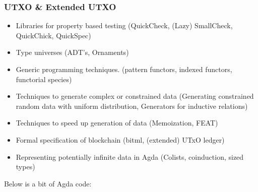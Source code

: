 \documentclass[11pt]{article}
\begin{document}
\subsubsection{UTXO \& Extended UTXO}

\begin{itemize}

\item
Libraries for property based testing (QuickCheck, (Lazy) SmallCheck, QuickChick, QuickSpec)

\item 
Type universes (ADT's, Ornaments) \cite{ko2016programming, dagand2017essence}

\item 
Generic programming techniques. (pattern functors, indexed functors, functorial species)

\item 
Techniques to generate complex or constrained data (Generating constrained random data with uniform distribution, Generators for inductive relations)

\item 
Techniques to speed up generation of data (Memoization, FEAT)

\item 
Formal specification of blockchain (bitml, (extended) UTxO ledger) \cite{zahnentferner2018chimeric, zahnentferner2018abstract}

\item 
Representing potentially infinite data in Agda (Colists, coinduction, sized types)

\end{itemize}

Below is a bit of Agda code: 
\end{document}
